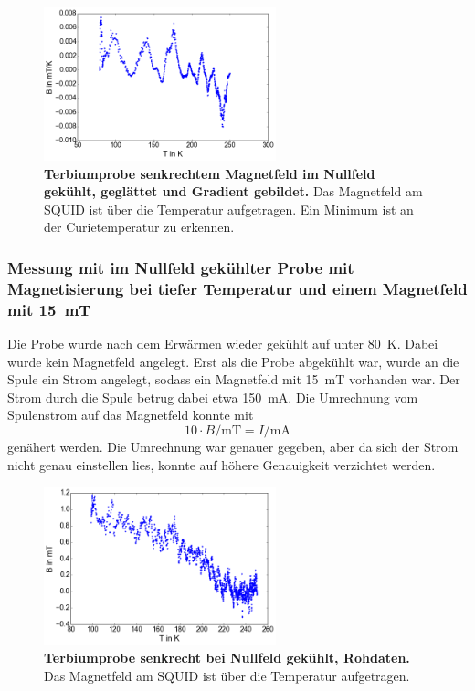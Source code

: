 \documentclass[a4paper,ngerman]{scrartcl}
\begin{document}
\begin{figure}
\centering
\includegraphics[width=0.6\textwidth]{abbildungen/Tb_sr_0_grad.png}
\caption[Terbiumprobe senkrecht bei Nullfeld]{\textbf{Terbiumprobe
    senkrechtem Magnetfeld im Nullfeld gekühlt, geglättet und Gradient gebildet.} Das Magnetfeld am SQUID ist über die Temperatur aufgetragen. Ein Minimum ist an der Curietemperatur zu erkennen.}
\label{fig:Tb_sr_0_grad}
\end{figure}

\subsubsection*{Messung mit im Nullfeld gekühlter Probe mit Magnetisierung bei tiefer Temperatur und einem Magnetfeld mit \SI{15}{mT}}

Die Probe wurde nach dem Erwärmen wieder gekühlt auf unter \SI{80}{K}.
Dabei wurde kein Magnetfeld angelegt.
Erst als die Probe abgekühlt war, wurde an die Spule ein Strom angelegt, sodass ein Magnetfeld mit \SI{15}{mT} vorhanden war.
Der Strom durch die Spule betrug dabei etwa \SI{150}{\mA}.
Die Umrechnung vom Spulenstrom auf das Magnetfeld konnte mit 
\begin{equation}
10 \cdot B/\mathrm{mT} = I /\mathrm{mA}
\end{equation} 
genähert werden. 
Die Umrechnung war genauer gegeben, aber da sich der Strom nicht genau einstellen lies, konnte auf höhere Genauigkeit verzichtet werden.


\begin{figure}
\centering
\includegraphics[width=0.6\textwidth]{abbildungen/Tb_sr_0_mit.png}
\caption[Terbiumprobe senkrecht bei Nullfeld]{\textbf{Terbiumprobe senkrecht bei Nullfeld gekühlt, Rohdaten.} Das Magnetfeld am SQUID ist über die Temperatur aufgetragen.}
\label{fig:Tb_sr_0_mit}
\end{figure}
\end{document}
